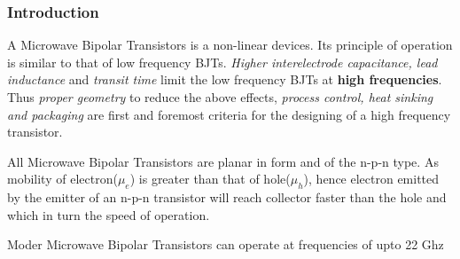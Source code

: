 \begin{frame}
  \frametitle{Introduction}
  A Microwave Bipolar Transistors is a non-linear devices. Its principle of operation is similar to that of low frequency BJTs. \emph{Higher interelectrode capacitance, lead inductance} and \emph{transit time} limit the low frequency BJTs at \textbf{high frequencies}. Thus \emph{proper geometry} to reduce the above effects, \emph{process control, heat sinking and packaging} are first and foremost criteria for the designing of a high frequency transistor.

  All Microwave Bipolar Transistors are planar in form and of the n-p-n type. As mobility of electron($\mu_e$) is greater than that of hole($\mu_h$), hence electron emitted by the emitter of an n-p-n transistor will reach collector faster than the hole and which in turn the speed of operation.

  Moder Microwave Bipolar Transistors can operate at frequencies of upto 22 Ghz
\end{frame}